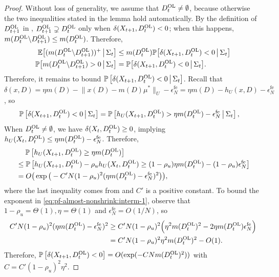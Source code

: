 \documentclass[11pt,letterpaper]{article}
\theoremstyle{plain}
\theoremstyle{definition}
\theoremstyle{remark}
\newcommand{\normplain}[1]{\lVert#1\rVert}
\newcommand{\Ebig}[1]{\mathbb{E}\big[#1\big]}
\newcommand{\givenbig}{\,\big|\,}
\newcommand{\Probbig}[1]{\mathbb{P}\big[#1\big]}
\newcommand{\Prob}[1]{\mathbb{P}\left[#1\right]}
\newcommand{\statdist}{\mu^*}
\newcommand{\umat}{U}
\newcommand{\errfe}{\epsilon_N^{\text{fe}}}
\newcommand{\hu}{h_\umat}
\newcommand{\rhou}{\rho_{u}}
\newcommand{\Db}{D^{\textup{OL}}}
\newcommand{\Fullstate}{\Sigma}
\newcommand{\slk}{\delta}
\newcommand{\slkb}{\delta}
\begin{document}
\almostnonshrinking*

\begin{proof}%
    Without loss of generality, we assume that $\Db_t \neq \emptyset$, because otherwise the two inequalities stated in the lemma hold automatically. 
    By the definition of $\Db_{t+1}$ in , $\Db_{t+1} \supsetneq \Db_t$ only when $\slk(X_{t+1}, \Db_t) < 0$; when this happens, $m(\Db_t \backslash \Db_{t+1}) \leq m(\Db_t)$. Therefore,     
    \begin{align}
        \nonumber
        \Ebig{(m(\Db_t\backslash \Db_{t+1}))^+ \givenbig \Fullstate_t} 
        &\leq m(\Db_t) \Probbig{\slkb(X_{t+1}, \Db_t) < 0 \givenbig \Fullstate_t} \\ 
        \nonumber
        \Probbig{m(\Db_{t}\backslash \Db_{t+1}) > 0 \givenbig \Fullstate_t}
        &= \Probbig{\slkb(X_{t+1}, \Db_t) < 0 \givenbig \Fullstate_t}.
    \end{align}
    Therefore, it remains to bound $\Prob{\slkb(X_{t+1}, \Db_t) < 0 \givenbig \Fullstate_t}$. Recall that $\slkb(x, D) = \eta m(D) -   \normplain{x(D)- m(D) \statdist}_\umat - \errfe = \eta m(D) - \hu(x, D) - \errfe$, so 
    \begin{align}
        \nonumber
        \Prob{\slkb(X_{t+1}, \Db_t) < 0 \givenbig \Fullstate_t}
        &= \Prob{\hu(X_{t+1},\Db_t) > \eta m(\Db_t) -\errfe \givenbig \Fullstate_t},
    \end{align}
    When $\Db_t \neq \emptyset$, we have
    $\slkb(X_t, \Db_t) \geq 0$, implying $\hu(X_t, \Db_t) \leq \eta m(\Db_t) - \errfe$. 
    Therefore, 
    \begin{align}
        \nonumber 
        &\mspace{23mu} \Prob{\hu(X_{t+1}, \Db_t) \geq \eta m(\Db_t)} \\
        \nonumber
        &\leq \Prob{\hu(X_{t+1}, \Db_t) - \rhou \hu(X_t, \Db_t) \geq (1-\rhou) \eta m(\Db_t) - (1-\rhou) \errfe} \\
        \label{eq:pf-almost-nonshrink:interm-1}
        &= O\big(\exp\big(-C' N (1-\rhou)^2 (\eta m(\Db_t)-\errfe)^2\big)\big),
    \end{align}
    where the last inequality comes from  and $C'$ is a positive constant. To bound the exponent in \eqref{eq:pf-almost-nonshrink:interm-1}, observe that $1-\rhou=\Theta(1), \eta = \Theta(1)$ and $\errfe = O(1/N)$, so  
    \begin{align*}
        C' N (1-\rhou)^2(\eta m(\Db_t)-\errfe)^2 
        &\geq C' N (1-\rhou)^2 \Big(\eta^2 m(\Db_t)^2 - 2\eta m(\Db_t) \errfe \Big) \\
        &= C' N (1-\rhou)^2 \eta^2  m(\Db_t)^2 - O(1). 
    \end{align*}
    Therefore,  $\Prob{\slkb(X_{t+1}, \Db_t) < 0} = O(\exp(-C N m(\Db_t)^2))$ with $C = C'(1-\rhou)^2 \eta^2$. 
\end{proof}
\end{document}
